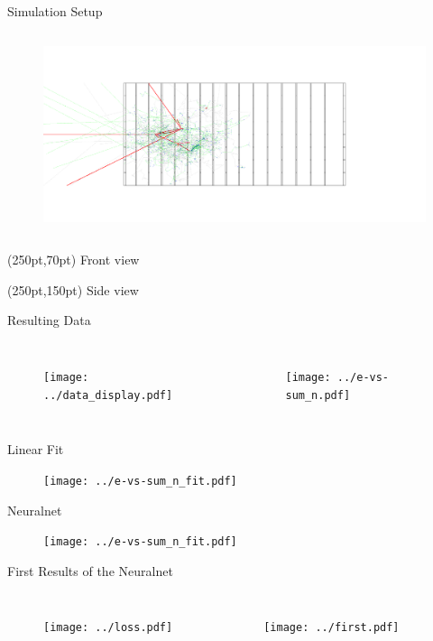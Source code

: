 \documentclass[10pt]{beamer}
\begin{document}
\begin{frame}{Simulation Setup}
\begin{columns}
\begin{figure}[htp]
      \includegraphics[width=1.1\textwidth]{side.png}
    \end{figure}
  \end{columns}
  \begin{textblock*}{100pt}(250pt,70pt)
    Front view
  \end{textblock*}
  \begin{textblock*}{100pt}(250pt,150pt)
    Side view
  \end{textblock*}
\end{frame}

\begin{frame}{Resulting Data}
  \begin{columns}
    \begin{figure}[htp]
      \texttt{[image: ../data\_display.pdf]}
    \end{figure}
    \begin{figure}[htp]
      \texttt{[image: ../e-vs-sum\_n.pdf]}
    \end{figure}
  \end{columns}
\end{frame}

\begin{frame}{Linear Fit}
    \begin{figure}[htp]
      \texttt{[image: ../e-vs-sum\_n\_fit.pdf]}
    \end{figure}  
\end{frame}

\begin{frame}{Neuralnet}
    \begin{figure}[htp]
      \texttt{[image: ../e-vs-sum\_n\_fit.pdf]}
    \end{figure}  
\end{frame}

\begin{frame}{First Results of the Neuralnet}
  \begin{columns}
    \begin{figure}[htp]
      \texttt{[image: ../loss.pdf]}
    \end{figure}
    \begin{figure}[htp]
      \texttt{[image: ../first.pdf]}
    \end{figure}
  \end{columns}
\end{frame}
\end{document}

